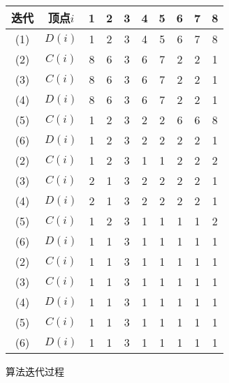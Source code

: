 \documentclass{article}
\begin{document}
\begin{figure}[h]
    \centering
    \begin{tabular}{c|c|cccccccc}
        迭代 & 顶点$i$ & 1 & 2 & 3 & 4 & 5 & 6 & 7 & 8 \\ \hline
        (1) & $D(i)$  & 1 & 2 & 3 & 4 & 5 & 6 & 7 & 8 \\ \hline
        (2) & $C(i)$  & 8 & 6 & 3 & 6 & 7 & 2 & 2 & 1 \\
        (3) & $C(i)$  & 8 & 6 & 3 & 6 & 7 & 2 & 2 & 1 \\
        (4) & $D(i)$  & 8 & 6 & 3 & 6 & 7 & 2 & 2 & 1 \\
        (5) & $C(i)$  & 1 & 2 & 3 & 2 & 2 & 6 & 6 & 8 \\
        (6) & $D(i)$  & 1 & 2 & 3 & 2 & 2 & 2 & 2 & 1 \\ \hline
        (2) & $C(i)$  & 1 & 2 & 3 & 1 & 1 & 2 & 2 & 2 \\
        (3) & $C(i)$  & 2 & 1 & 3 & 2 & 2 & 2 & 2 & 1 \\
        (4) & $D(i)$  & 2 & 1 & 3 & 2 & 2 & 2 & 2 & 1 \\
        (5) & $C(i)$  & 1 & 2 & 3 & 1 & 1 & 1 & 1 & 2 \\
        (6) & $D(i)$  & 1 & 1 & 3 & 1 & 1 & 1 & 1 & 1 \\ \hline
        (2) & $C(i)$  & 1 & 1 & 3 & 1 & 1 & 1 & 1 & 1 \\
        (3) & $C(i)$  & 1 & 1 & 3 & 1 & 1 & 1 & 1 & 1 \\
        (4) & $D(i)$  & 1 & 1 & 3 & 1 & 1 & 1 & 1 & 1 \\
        (5) & $C(i)$  & 1 & 1 & 3 & 1 & 1 & 1 & 1 & 1 \\
        (6) & $D(i)$  & 1 & 1 & 3 & 1 & 1 & 1 & 1 & 1
    \end{tabular}
    \caption{算法迭代过程}
    \label{figure:7.11Solution}
\end{figure}
\end{document}

